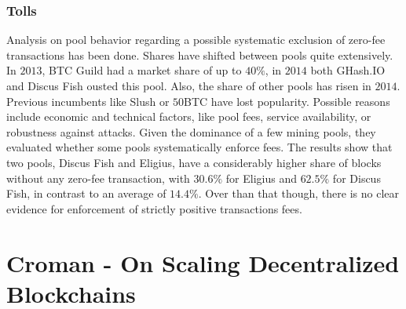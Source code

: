 \documentclass[USenglish]{uit-thesis}
\begin{document}
\subsubsection{Tolls}
Analysis on pool behavior regarding a possible systematic
exclusion of zero-fee transactions has been done.
Shares have shifted between pools quite extensively.
In $2013$, BTC Guild had a market share of up to $40\%$,
in $2014$ both GHash.IO and Discus Fish ousted this pool.
Also, the share of other pools has risen in $2014$. Previous
incumbents like Slush or $50$BTC have lost popularity.
Possible reasons include economic and technical factors,
like pool fees, service availability, or robustness against
attacks. Given the dominance of a few mining pools, they
evaluated whether some pools systematically enforce fees.
The results show that two pools, Discus Fish and Eligius,
have a considerably higher share of blocks without any
zero-fee transaction, with $30.6\%$ for Eligius and $62.5\%$
for Discus Fish, in contrast to an average of $14.4\%$.
Over than that though, there is no clear evidence for
enforcement of strictly positive transactions fees.
 
\section{Croman - On Scaling Decentralized Blockchains\,\cite{croman2016}}
\label{sec:croman}
\end{document}
